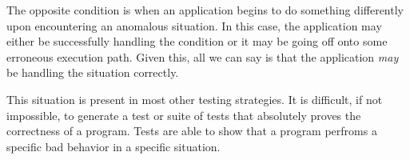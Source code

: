 The opposite condition is when an application begins to do something differently upon encountering an anomalous
situation.  In this case, the application may either be successfully handling the condition or it may be going off onto
some erroneous execution path.  Given this, all we can say is that the application \emph{may} be handling the situation
correctly.

This situation is present in most other testing strategies. It is difficult, if not impossible, to generate a test or
suite of tests that absolutely proves the correctness of a program. Tests are able to show that a program perfroms a
specific bad behavior in a specific situation. 